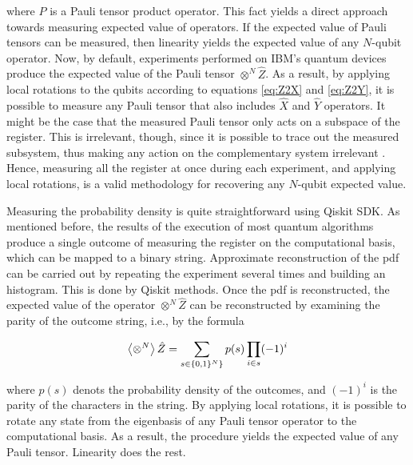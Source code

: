     where $P$ is a Pauli tensor product operator. This fact yields a direct approach towards measuring expected value of operators. If the expected value of Pauli tensors can be measured, then linearity yields the expected value of any $N$-qubit operator. Now, by default, experiments performed on IBM's quantum devices produce the expected value of the Pauli tensor $\otimes^{N} \hat{Z}$. As a result, by applying local rotations to the qubits according to equations \ref{eq:Z2X} and \ref{eq:Z2Y}, it is possible to measure any Pauli tensor that also includes $\hat{X}$ and $\hat{Y}$ operators. It might be the case that the measured Pauli tensor only acts on a subspace of the register. This is irrelevant, though, since it is possible to trace out the measured subsystem, thus making any action on the complementary system irrelevant \cite{Nielsen}. Hence, measuring all the register at once during each experiment, and applying local rotations, is a valid methodology for recovering any $N$-qubit expected value.

    Measuring the probability density is quite straightforward using Qiskit SDK. As mentioned before, the results of the execution of most quantum algorithms produce a single outcome of measuring the register on the computational basis, which can be mapped to a binary string. Approximate reconstruction of the pdf can be carried out by repeating the experiment several times and building an histogram. This is done by Qiskit methods. Once the pdf is reconstructed, the expected value of the operator $\otimes^{N} \hat{Z}$ can be reconstructed by examining the parity of the outcome string, i.e., by the formula
    
    \begin{equation}
      \expval{\otimes^{N}} \hat{Z} = \sum_{s \in \{0,1\}^{N}\}} p(s) \prod_{i \in s} (-1)^{i}
      \label{eq:expValPauliZ}
    \end{equation}

    where $p(s)$ denots the probability density of the outcomes, and $(-1)^{i}$ is the parity of the characters in the string. By applying local rotations, it is possible to rotate any state from the eigenbasis of any Pauli tensor operator to the computational basis. As a result, the procedure yields the expected value of any Pauli tensor. Linearity does the rest.

